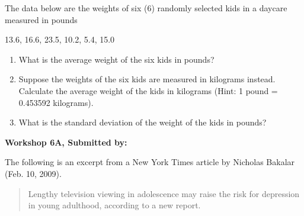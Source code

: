 \documentclass[11pt, chapterprefix=true]{scrbook}\usepackage[]{graphicx}\usepackage[]{color}
\begin{document}
\begin{exercises}
\begin{exercise}
The data below are the weights of six (6) randomly selected kids in a daycare measured in pounds 

 13.6, 16.6, 23.5, 10.2, 5.4, 15.0

\begin{enumerate}
  \item What is the average weight of the six kids in pounds?
  \item Suppose the weights of the six kids are measured in kilograms instead. Calculate the average weight of the kids in kilograms (Hint: 1 pound = 0.453592 kilograms).
  \item What is the standard deviation of the weight of the kids in pounds?
\end{enumerate}


\end{exercise} 
\begin{solution}  %

\end{solution}


\clearpage

    \begin{exercise}  %

    \begin{center}
\begin{flushleft}\textbf{\large \hfill Workshop 6A, Submitted by: }\end{flushleft}

\end{center}

The following is an excerpt from a New York Times article by Nicholas Bakalar (Feb. 10, 2009).

\begin{quotation}
Lengthy television viewing in adolescence may raise the risk for depression in young adulthood, according to a new report.


\end{quotation}
\end{exercise}
\end{exercises}
\end{document}
